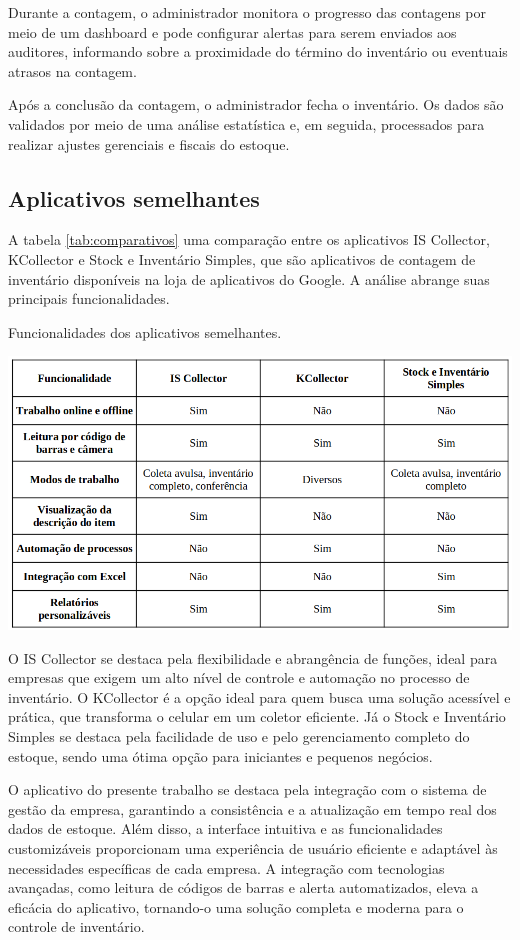 Durante a contagem, o administrador monitora o progresso das contagens por meio de um dashboard e pode configurar alertas para serem enviados aos auditores, informando sobre a proximidade do término do inventário ou eventuais atrasos na contagem.

Após a conclusão da contagem, o administrador fecha o inventário. Os dados são validados por meio de uma análise estatística e, em seguida, processados para realizar ajustes gerenciais e fiscais do estoque.

\subsection{Aplicativos semelhantes}

A tabela \ref{tab:comparativos} uma comparação entre os aplicativos IS Collector, KCollector e Stock e Inventário Simples, que são aplicativos de contagem de inventário disponíveis na loja de aplicativos do Google. A análise abrange suas principais funcionalidades.

\begin{table}[!htb]
    \centering
    \caption{Funcionalidades dos aplicativos semelhantes.}
    \label{tab:comparativos}
    \includegraphics[width=1.0\textwidth]{tables/comparativo.png}
\end{table}

O IS Collector se destaca pela flexibilidade e abrangência de funções, ideal para empresas que exigem um alto nível de controle e automação no processo de inventário. O KCollector é a opção ideal para quem busca uma solução acessível e prática, que transforma o celular em um coletor eficiente. Já o Stock e Inventário Simples se destaca pela facilidade de uso e pelo gerenciamento completo do estoque, sendo uma ótima opção para iniciantes e pequenos negócios.

O aplicativo do presente trabalho se destaca pela integração com o sistema de gestão da empresa, garantindo a consistência e a atualização em tempo real dos dados de estoque. Além disso, a interface intuitiva e as funcionalidades customizáveis proporcionam uma experiência de usuário eficiente e adaptável às necessidades específicas de cada empresa. A integração com tecnologias avançadas, como leitura de códigos de barras e alerta automatizados, eleva a eficácia do aplicativo, tornando-o uma solução completa e moderna para o controle de inventário.
